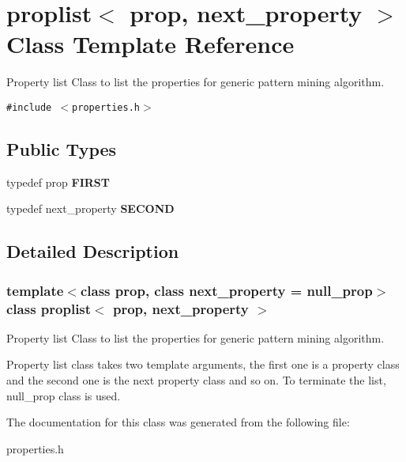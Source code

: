 \section{proplist$<$ prop, next\_\-property $>$ Class Template Reference}
\label{classproplist}
Property list Class to list the properties for generic pattern mining algorithm.  


{\tt \#include $<$properties.h$>$}

\subsection*{Public Types}
\begin{CompactItemize}
\item 
typedef prop \textbf{FIRST}\label{classproplist_d4cd244f23786cc179afc44ecd09211e}

\item 
typedef next\_\-property \textbf{SECOND}\label{classproplist_0cc1bb710a2257d21b7d837c30a6743d}

\end{CompactItemize}


\subsection{Detailed Description}
\subsubsection*{template$<$class prop, class next\_\-property = null\_\-prop$>$ class proplist$<$ prop, next\_\-property $>$}

Property list Class to list the properties for generic pattern mining algorithm. 

Property list class takes two template arguments, the first one is a property class and the second one is the next property class and so on. To terminate the list, null\_\-prop class is used. 



The documentation for this class was generated from the following file:\begin{CompactItemize}
\item 
properties.h\end{CompactItemize}
